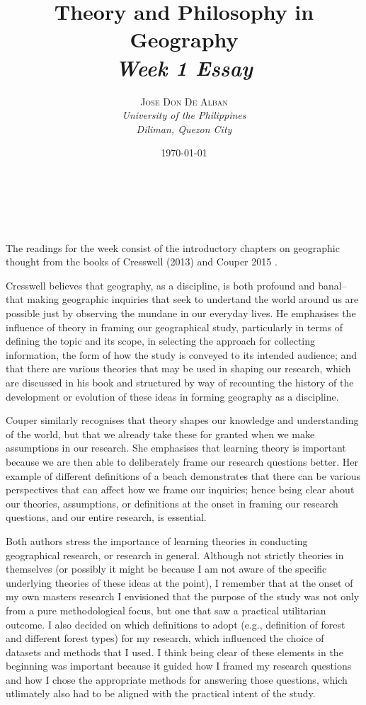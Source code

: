 \documentclass[a4paper, 10.5pt]{article} %
\title{\textbf{Theory and Philosophy in Geography}\\ %
\textsl{Week 1 Essay}} %
\author{\textsc{Jose Don De Alban} %
\\{\textit{University of the Philippines} %
\\{\textit{Diliman, Quezon City}}}} %
\date{\today} %
\makeatletter
\renewcommand{\maketitle}
{
\begin{flushright} %
{\LARGE\@title} %
\vspace{40pt} %

{\large\@author} %
\\\@date %

\vspace{10pt} %
\end{flushright}
}
\makeatother
\begin{document}
\maketitle %


\section*{}

The readings for the week consist of the introductory chapters on geographic
thought from the books of Cresswell (2013) \cite{cresswell_2013} and Couper 2015
\cite{couper_2015}.

Cresswell believes that geography, as a discipline, is both profound and banal--
that making geographic inquiries that seek to undertand the world around us are
possible just by observing the mundane in our everyday lives. He emphasises the
influence of theory in framing our geographical study, particularly in terms of
defining the topic and its scope, in selecting the approach for collecting
information, the form of how the study is conveyed to its intended audience;
and that there are various theories that may be used in shaping our research,
which are discussed in his book and structured by way of recounting the history
of the development or evolution of these ideas in forming geography as a
discipline.

Couper similarly recognises that theory shapes our knowledge and understanding
of the world, but that we already take these for granted when we make
assumptions in our research. She emphasises that learning theory is important
because we are then able to deliberately frame our research questions better.
Her example of different definitions of a beach demonstrates that there can be
various perspectives that can affect how we frame our inquiries; hence being
clear about our theories, assumptions, or definitions at the onset in framing
our research questions, and our entire research, is essential.

Both authors stress the importance of learning theories in conducting
geographical research, or research in general. Although not strictly theories in
themselves (or possibly it might be because I am not aware of the specific
underlying theories of these ideas at the point), I remember that at the onset
of my own masters research I envisioned that the purpose of the study was not
only from a pure methodological focus, but one that saw a practical utilitarian
outcome. I also decided on which definitions to adopt (e.g., definition of
forest and different forest types) for my research, which influenced the choice
of datasets and methods that I used. I think being clear of these elements in
the beginning was important because it guided how I framed my research questions
and how I chose the appropriate methods for answering those questions, which
utlimately also had to be aligned with the practical intent of the study.
\end{document}
